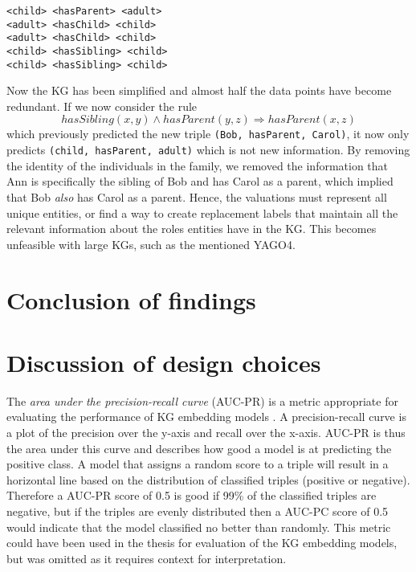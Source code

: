 \begin{example}
\begin{lstlisting}[]
<child> <hasParent> <adult>
<adult> <hasChild> <child>
<adult> <hasChild> <child>
<child> <hasSibling> <child>
<child> <hasSibling> <child>
\end{lstlisting}
\label{mini_simple_KG_rules}
\end{example}

Now the KG has been simplified and almost half the data points have become redundant. If we now consider the rule \[hasSibling(x, y) \wedge hasParent(y,z) \Rightarrow hasParent(x,z)\] which previously predicted the new triple \texttt{(Bob, hasParent, Carol)}, it now only predicts \texttt{(child, hasParent, adult)} which is not new information. By removing the identity of the individuals in the family, we removed the information that Ann is specifically the sibling of Bob and has Carol as a parent, which implied that Bob \textit{also} has Carol as a parent. Hence, the valuations must represent all unique entities, or find a way to create replacement labels that maintain all the relevant information about the roles entities have in the KG. This becomes unfeasible with large KGs, such as the mentioned YAGO4.


\section{Conclusion of findings}

\section{Discussion of design choices}
The \textit{area under the precision-recall curve} (AUC-PR) is a metric appropriate for evaluating the performance of KG embedding models \cite{jahn2021reasoning}. A precision-recall curve is a plot of the precision over the y-axis and recall over the x-axis. AUC-PR is thus the area under this curve and describes how good a model is at predicting the positive class. A model that assigns a random score to a triple will result in a horizontal line based on the distribution of classified triples (positive or negative). Therefore a AUC-PR score of 0.5 is good if 99\% of the classified triples are negative, but if the triples are evenly distributed then a AUC-PC score of 0.5 would indicate that the model classified no better than randomly. This metric could have been used in the thesis for evaluation of the KG embedding models, but was omitted as it requires context for interpretation.


